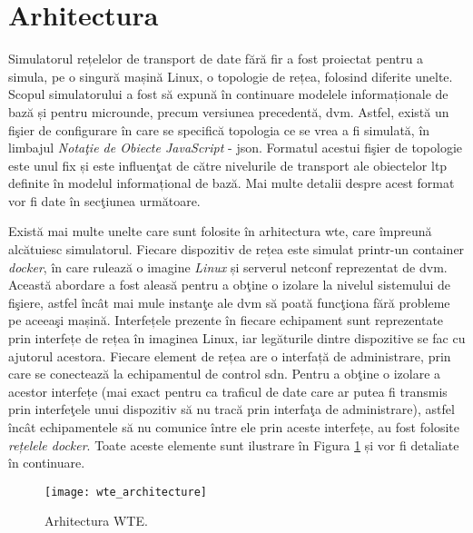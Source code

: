 \section{Arhitectura}

Simulatorul rețelelor de transport de date fără fir a fost proiectat pentru a simula, pe o singură mașină Linux, o topologie de rețea, folosind diferite unelte. Scopul simulatorului a fost să expună în continuare modelele informaționale de bază și pentru microunde, precum versiunea precedentă, \gls{dvm}. Astfel, există un fişier de configurare în care se specifică topologia ce se vrea a fi simulată, în limbajul \textit{Notaţie de Obiecte JavaScript} - \gls{json}. Formatul acestui fişier de topologie este unul fix și este influenţat de către nivelurile de transport ale obiectelor \gls{ltp} definite în modelul informațional de bază. Mai multe detalii despre acest format vor fi date în secţiunea următoare.

Există mai multe unelte care sunt folosite în arhitectura \gls{wte}, care împreună alcătuiesc simulatorul. Fiecare dispozitiv de rețea este simulat printr-un container \textit{docker}, în care rulează o imagine \textit{Linux} și serverul \gls{netconf} reprezentat de \gls{dvm}. Această abordare a fost aleasă pentru a obţine o izolare la nivelul sistemului de fişiere, astfel încât mai mule instanţe ale \gls{dvm} să poată funcţiona fără probleme pe aceeaşi mașină. Interfețele prezente în fiecare echipament sunt reprezentate prin interfețe de rețea în imaginea Linux, iar legăturile dintre dispozitive se fac cu ajutorul acestora. Fiecare element de rețea are o interfață de administrare, prin care se conectează la echipamentul de control \gls{sdn}. Pentru a obţine o izolare a acestor interfețe (mai exact pentru ca traficul de date care ar putea fi transmis prin interfeţele unui dispozitiv să nu tracă prin interfaţa de administrare), astfel încât echipamentele să nu comunice între ele prin aceste interfețe, au fost folosite \textit{rețelele docker}. Toate aceste elemente sunt ilustrare în Figura \ref{fig:wte_architecture} și vor fi detaliate în continuare.

\begin{figure}[h]
	\centering
	\texttt{[image: wte\_architecture]}
	\caption{Arhitectura WTE.}
	\label{fig:wte_architecture}
\end{figure}

